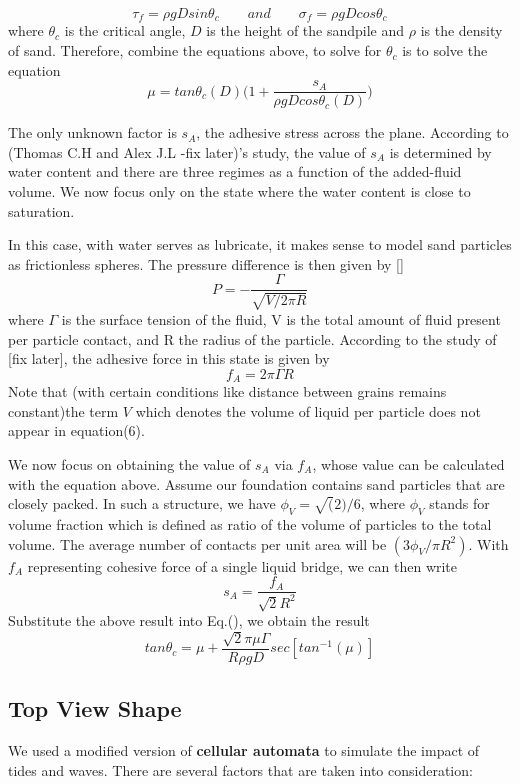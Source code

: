 \documentclass[12pt]{article}
\begin{document}
$$\tau_f = \rho gDsin\theta_c \qquad and \qquad \sigma_f = \rho gDcos\theta_c$$
where $\theta_c$ is the critical angle, $D$ is the height of the sandpile and $\rho$ is the density of sand. Therefore, combine the equations above, to solve for $\theta_c$ is to solve the equation
$$\mu = tan\theta_c(D)\bigg(1 + \frac{s_A}{\rho gDcos\theta_c(D)}\bigg)$$
\par
The only unknown factor is $s_A$, the adhesive stress across the plane. According to (Thomas C.H and Alex J.L -fix later)'s study, the value of $s_A$ is determined by water content and there are three regimes as a function of the added-fluid volume. We now focus only on the state where the water content is close to saturation.
\par
In this case, with water serves as lubricate, it makes sense to model sand particles as frictionless spheres. The pressure difference is then given by []
$$P = -\frac{\Gamma}{\sqrt{V/2\pi R}}$$
where $\Gamma$ is the surface tension of the fluid, V is the total amount of fluid present per particle contact, and R the radius of the particle. According to the study of [fix later], the adhesive force in this state is given by
$$f_A = 2\pi \Gamma R$$
Note that (with certain conditions like distance between grains remains constant)the term $V$ which denotes the volume of liquid per particle does not appear in equation(6).
\par
We now focus on obtaining the value of $s_A$ via $f_A$, whose value can be calculated with the equation above. Assume our foundation contains sand particles that are closely packed. In such a structure, we have $\phi_V = \sqrt(2)/6$, where $\phi_V$ stands for volume fraction which is defined as ratio of the volume of particles to the total volume. The average number of contacts per unit area will be $(3\phi_V/\pi R^2)$. With $f_A$ representing cohesive force of a single liquid bridge, we can then write
$$ s_A = \frac{f_A}{\sqrt{2}R^2}$$
Substitute the above result into Eq.(), we obtain the result
$$ tan\theta_c = \mu + \frac{\sqrt{2}\pi\mu\Gamma}{R\rho gD}sec[tan^{-1}(\mu)] $$

\subsection{Top View Shape}
\newenvironment{longlisting}{\captionsetup{type=listing}}{}

\par
We used a modified version of\textbf{ cellular automata} to simulate the impact of tides and waves. There are several factors that are taken into consideration:
\par
\end{document}
